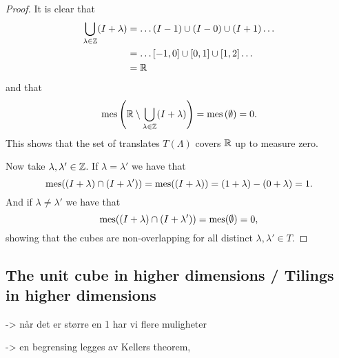 \documentclass[../thesis.tex]{subfiles}
\begin{document}
\begin{proof}
    It is clear that
    \begin{align*}
        \bigcup_{\lambda\in \mathbb{Z}} (I + \lambda) &= \dots (I-1) \cup (I-0) \cup (I+1) \dots\\ 
        &= \dots [-1,0] \cup [0,1] \cup [1,2] \dots\\
        &= \mathbb{R}
    \end{align*}
    and that 
    \begin{align*}
        \operatorname{mes}\left(\mathbb{R} \setminus \bigcup_{\lambda\in \mathbb{Z}} (I + \lambda) \right) = \operatorname{mes}\left(\emptyset\right) = 0.
    \end{align*}
    This shows that the set of translates $T(\Lambda)$ covers $\mathbb{R}$ up to measure zero. 
    
    Now take $\lambda,\lambda' \in \mathbb{Z}$. If $\lambda = \lambda'$ we have that
    \begin{equation*}
        \operatorname{mes}((I+\lambda) \cap (I+\lambda')) = \operatorname{mes}((I+\lambda)) = (1+\lambda) - (0+\lambda) = 1.
    \end{equation*}
    And if $\lambda \neq \lambda'$ we have that 
    \begin{equation*}
        \operatorname{mes}((I+\lambda) \cap (I+\lambda')) = \operatorname{mes}(\emptyset) = 0,
    \end{equation*}
    showing that the cubes are non-overlapping for all distinct $\lambda , \lambda' \in T$. 
\end{proof}


\subsection{The unit cube in higher dimensions / Tilings in higher dimensions}
-> når det er større en 1 har vi flere muligheter

-> en begrensing legges av Kellers theorem, 





\end{document}
